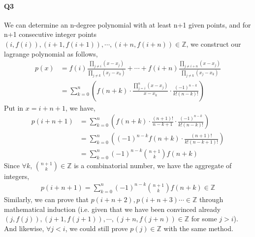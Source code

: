 \documentclass[11pt]{article}
\begin{document}
\paragraph{Q3}
We can determine an n-degree polynomial with at least n+1 given points, and for n+1 consecutive integer points $(i,f(i)),(i+1,f(i+1)),\cdots,(i+n,f(i+n)) \in \mathbb{Z}$, we construct our lagrange polynomial as follows,
\begin{align}
	p(x)&=f(i)\frac{\prod_{j\ne i}(x-x_j)}{\prod_{j\ne k}(x_j-x_k)}+\cdots+f(i+n)\frac{\prod_{j\ne i+n}(x-x_j)}{\prod_{j\ne k}(x_j-x_k)}\\
	&=\sum_{k=0}^{n}(f(n+k)\cdot\frac{\prod_{j=i}^{n}(x-x_j)}{x-x_k}\cdot\frac{(-1)^{n-k}}{k!(n-k)!})
\end{align}
Put in $x=i+n+1$, we have,
\begin{align}
	p(i+n+1)&=\sum_{k=0}^{n}(f(n+k)\cdot\frac{(n+1)!}{n-k+1}\cdot\frac{(-1)^{n-k}}{k!(n-k)!})\\
	&=\sum_{k=0}^{n}((-1)^{n-k}f(n+k)\cdot\frac{(n+1)!}{k!(n-k+1)!})\\
	&=\sum_{k=0}^{n}(-1)^{n-k}\binom{n+1}{k}f(n+k)
\end{align}
Since $\forall k$, $\binom{n+1}{k}\in \mathbb{Z}$ is a combinatorial number, we have the aggregate of integers,
\begin{align}
	p(i+n+1)=\sum_{k=0}^{n}(-1)^{n-k}\binom{n+1}{k}f(n+k) \in \mathbb{Z}
\end{align}
Similarly, we can prove that $p(i+n+2), p(i+n+3) \cdots \in \mathbb{Z}$ through mathematical induction (i.e. given that we have been convinced already $(j,f(j)),(j+1,f(j+1)),\cdots,(j+n,f(j+n)) \in \mathbb{Z}$ for some $j>i$). And likewise, $\forall j<i$, we could still prove $p(j) \in \mathbb{Z}$ with the same method. 
\end{document}
